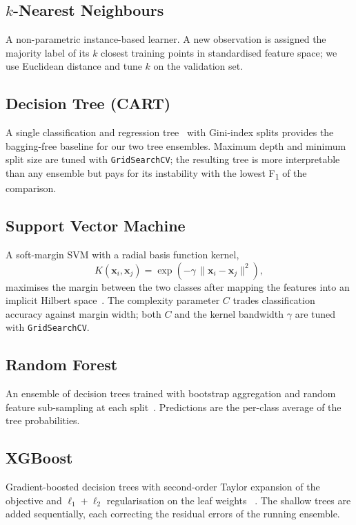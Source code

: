 \documentclass[conference]{IEEEtran}
\begin{document}
\subsection{$k$-Nearest Neighbours}
A non-parametric instance-based learner. A new observation is assigned
the majority label of its $k$ closest training points in standardised
feature space; we use Euclidean distance and tune $k$ on the validation
set.

\subsection{Decision Tree (CART)}
A single classification and regression tree~\cite{breiman1984cart} with
Gini-index splits provides the bagging-free baseline for our two
tree ensembles. Maximum depth and minimum split size are tuned with
\texttt{GridSearchCV}; the resulting tree is more interpretable than any
ensemble but pays for its instability with the lowest F\textsubscript{1}
of the comparison.

\subsection{Support Vector Machine}
A soft-margin SVM with a radial basis function kernel,
\begin{equation}
  K(\mathbf{x}_i,\mathbf{x}_j) = \exp(-\gamma\,\|\mathbf{x}_i-\mathbf{x}_j\|^2),
\end{equation}
maximises the margin between the two classes after mapping the
features into an implicit Hilbert space~\cite{cortes1995svm}. The
complexity parameter $C$ trades classification accuracy against
margin width; both $C$ and the kernel bandwidth $\gamma$ are tuned
with \texttt{GridSearchCV}.

\subsection{Random Forest}
An ensemble of decision trees trained with bootstrap aggregation and
random feature sub-sampling at each split~\cite{breiman2001random}.
Predictions are the per-class average of the tree probabilities.

\subsection{XGBoost}
Gradient-boosted decision trees with second-order Taylor expansion of
the objective and $\ell_1+\ell_2$ regularisation on the leaf weights
~\cite{chen2016xgboost}. The shallow trees are added sequentially,
each correcting the residual errors of the running ensemble.
\end{document}
